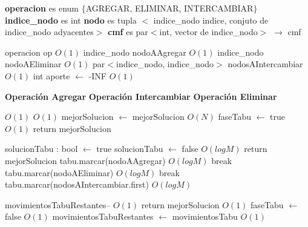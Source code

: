 \documentclass[a4paper, 10pt, twoside]{article}
\newenvironment{pseudo}[1][]{%
    \vspace{1em}%
    \begin{algorithmic}%
}
{%
    \end{algorithmic}%
    \vspace{1em}%
}
\newcommand{\Ode}[1]{\hfill $O(#1)$}
\begin{document}
\begin{pseudo}

\State \textbf{operacion} es enum $\lbrace$AGREGAR, ELIMINAR, INTERCAMBIAR$\rbrace$
\State \textbf{indice\_nodo} es int
\State \textbf{nodo} es tupla $<$ indice\_nodo indice, conjuto de indice\_nodo adyacentes$>$
\State \textbf{cmf} es par$<$int, vector de indice\_nodo$>$
\State
{} $\rightarrow$ cmf
	

	\State operacion op 																		\Ode{1}
	\State indice\_nodo nodoAAgregar															\Ode{1}
	\State indice\_nodo nodoAEliminar															\Ode{1}
	\State par$<$indice\_nodo, indice\_nodo$>$ nodosAIntercambiar								\Ode{1}
	\State int aporte $\leftarrow$ -INF															\Ode{1}

	\State
	\State \textbf{Operación Agregar}
	\State
	\State \textbf{Operación Intercambiar}
	\State
	\State \textbf{Operación Eliminar}
	\State

																				\Ode{1}
																					\Ode{1}
				\State mejorSolucion $\leftarrow$ mejorSolucion 								\Ode{N}
				\State faseTabu $\leftarrow$ true 												\Ode{1}
			\EndIf
			\State
			 return mejorSolucion \EndIf

			\State solucionTabu : bool $\leftarrow$ true
				 solucionTabu $\leftarrow$ false \EndIf \Ode{log M}
			\EndFor
			\State
			 return mejorSolucion \EndIf
			\State
				    \State tabu.marcar(nodoAAgregar)										 	\Ode{log M}	
				    \State break
				\EndCase
					\State  tabu.marcar(nodoAEliminar) 											\Ode{log M}
					\State break
				\EndCase
					\State tabu.marcar(nodosAIntercambiar.first)								\Ode{log M}
				\EndCase
			\EndSwitch

			\State movimientosTabuRestantes--													\Ode{1}
			 return mejorSolucion
			\EndIf
		\Else
			          \Ode{1}
				\State faseTabu $\leftarrow$ false 												\Ode{1}
				\State movimientosTabuRestantes $\leftarrow$ movimientosTabu 					\Ode{1}
			\EndIf
		\EndIf



\end{pseudo}
\end{document}
